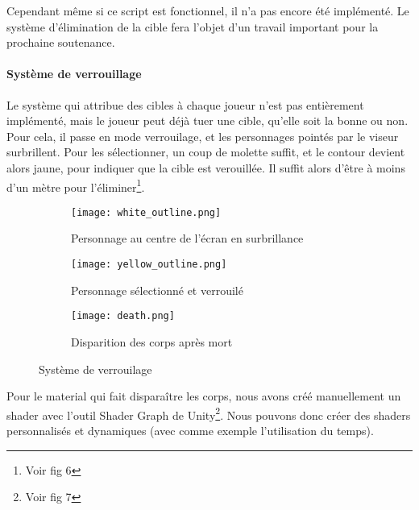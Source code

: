             Cependant même si ce script est fonctionnel, il n'a pas encore été implémenté. 
            Le système d'élimination de la cible fera l'objet d'un travail important pour la prochaine soutenance.
        
        
        \paragraph{Système de verrouillage}
            
            Le système qui attribue des cibles à chaque joueur n'est pas entièrement implémenté, mais le joueur peut déjà tuer une cible, qu'elle soit la bonne ou non.
            Pour cela, il passe en mode verrouilage, et les personnages pointés par le viseur surbrillent.
            Pour les sélectionner, un coup de molette suffit, et le contour devient alors jaune, pour indiquer que la cible est verouillée.
            Il suffit alors d'être à moins d'un mètre pour l'éliminer\footnote{Voir fig 6}.

            \begin{figure}[hbt!]
                \centering
                \begin{subfigure}[b]{0.3\textwidth}
                    \texttt{[image: white\_outline.png]} 
                    \caption{Personnage au centre de l'écran en surbrillance}
                \end{subfigure}
                \hspace{150pt}
                \begin{subfigure}[b]{0.3\textwidth}
                    \texttt{[image: yellow\_outline.png]} 
                    \caption{Personnage sélectionné et verrouilé}
                \end{subfigure}

                \begin{subfigure}[b]{0.3\textwidth}
                    \texttt{[image: death.png]} 
                    \caption{Disparition des corps après mort}
                \end{subfigure}
                \caption{Système de verrouilage}
            \end{figure}

            Pour le material qui fait disparaître les corps, nous avons créé manuellement un shader avec l'outil Shader Graph de Unity\footnote{Voir fig 7}.
            Nous pouvons donc créer des shaders personnalisés et dynamiques (avec comme exemple l'utilisation du temps).

